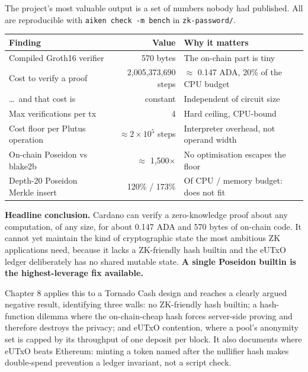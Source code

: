 \documentclass[10pt,a4paper]{article}
\begin{document}
The project's most valuable output is a set of numbers nobody had published.
All are reproducible with \texttt{aiken check -m bench} in \texttt{zk-password/}.

\begin{tabularx}{\textwidth}{@{}l r X@{}}
\toprule
\textbf{Finding} & \textbf{Value} & \textbf{Why it matters} \\
\midrule
Compiled Groth16 verifier       & 570 bytes                   & The on-chain part is tiny \\
Cost to verify a proof          & 2,005,373,690 steps         & $\approx$ 0.147 ADA, 20\% of the CPU budget \\
\dots\ and that cost is         & constant                    & Independent of circuit size \\
Max verifications per tx        & 4                           & Hard ceiling, CPU-bound \\
Cost floor per Plutus operation & $\approx 2\times10^5$ steps & Interpreter overhead, not operand width \\
On-chain Poseidon vs blake2b    & $\approx$ 1,500$\times$     & No optimisation escapes the floor \\
Depth-20 Poseidon Merkle insert & 120\% / 173\%               & Of CPU / memory budget: does not fit \\
\bottomrule
\end{tabularx}

\begin{keybox}
\textbf{Headline conclusion.} Cardano can verify a zero-knowledge proof about
any computation, of any size, for about 0.147 ADA and 570 bytes of on-chain
code. It cannot yet maintain the kind of cryptographic state the most ambitious
ZK applications need, because it lacks a ZK-friendly hash builtin and the eUTxO
ledger deliberately has no shared mutable state. \textbf{A single Poseidon
builtin is the highest-leverage fix available.}
\end{keybox}

Chapter 8 applies this to a Tornado Cash design and reaches a clearly argued
negative result, identifying three walls: no ZK-friendly hash builtin; a
hash-function dilemma where the on-chain-cheap hash forces server-side proving
and therefore destroys the privacy; and eUTxO contention, where a pool's
anonymity set is capped by its throughput of one deposit per block. It also
documents where eUTxO beats Ethereum: minting a token named after the nullifier
hash makes double-spend prevention a ledger invariant, not a script check.
\end{document}

